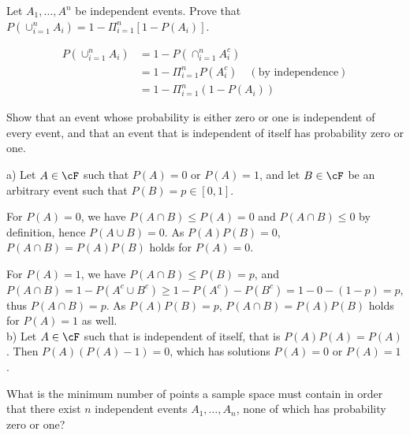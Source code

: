 \begin{exercise}
  Let $A_1,\ldots,A^n$ be independent events. Prove that $P(\cup_{i=1}^nA_i)=1-\Pi_{i=1}^n[1-P(A_i)]$.
\end{exercise}
\begin{solution}
  \begin{align*}
    P(\cup_{i=1}^nA_i) &= 1 - P(\cap_{i=1}^n A_i^c) \\
      &= 1 - \Pi_{i=1}^n P(A_i^c)  \quad(\mbox{by independence}) \\
      &= 1 - \Pi_{i=1}^n (1-P(A_i))
  \end{align*}
\end{solution}


\begin{exercise}
  Show that an event whose probability is either zero or one is independent of every event, and that an event that is independent of itself has probability zero or one.
\end{exercise}
\begin{solution}
  a) Let $A\in\cF$ such that $P(A)=0$ or $P(A)=1$, and let $B\in\cF$ be an arbitrary event such that $P(B)=p\in[0, 1]$.

  For $P(A)=0$, we have $P(A\cap B)\leq P(A) = 0$ and $P(A\cap B)\leq 0$ by definition, hence $P(A\cup B) =0$. As $P(A)P(B)=0$, $P(A\cap B)=P(A)P(B)$ holds for $P(A)=0$.

  For $P(A)=1$, we have $P(A\cap B)\leq P(B) = p$, and $P(A\cap B) = 1 - P(A^c\cup B^c) \geq 1 - P(A^c) - P(B^c) = 1 - 0 - (1-p) = p$, thus $P(A\cap B) = p$. As $P(A)P(B)=p$, $P(A\cap B)=P(A)P(B)$ holds for $P(A)=1$ as well. \\

  b) Let $A\in\cF$ such that is independent of itself, that is $P(A)P(A) = P(A)$. Then $P(A)(P(A)-1)=0$, which has solutions $P(A)=0$ or $P(A)=1$.
\end{solution}


\begin{exercise}
  What is the minimum number of points a sample space must contain in order that there exist $n$ independent events $A_1,\ldots,A_n$, none of which has probability zero or one?
\end{exercise}
\begin{solution}
  [TODO]
\end{solution}
